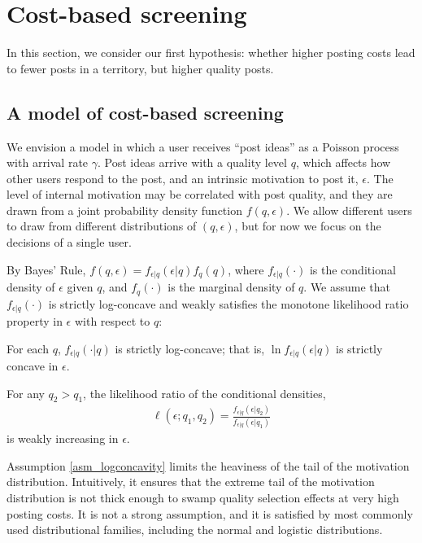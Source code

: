 \section{Cost-based screening}\label{sec_pay_to_post}

In this section, we consider our first hypothesis: whether higher posting costs lead to fewer posts in a territory, but higher quality posts. 

\subsection{A model of cost-based screening} \label{sec_pay_to_post_model}

We envision a model in which a user receives ``post ideas'' as a Poisson process with arrival rate $\gamma$. Post ideas arrive with a quality level $q$, which affects how other users respond to the post, and an intrinsic motivation to post it, $\epsilon$. The level of internal motivation may be correlated with post quality, and they are drawn from a joint probability density function $f(q, \epsilon)$. We allow different users to draw from different distributions of $(q,\epsilon)$, but for now we focus on the decisions of a single user.

By Bayes' Rule, $f(q, \epsilon) = f_{\epsilon|q} (\epsilon | q) f_q (q)$, where $f_{\epsilon|q}(\cdot)$ is the conditional density of $\epsilon$ given $q$, and $f_q(\cdot)$ is the marginal density of $q$. We assume that $f_{\epsilon|q}(\cdot)$ is strictly log-concave and weakly satisfies the monotone likelihood ratio property in $\epsilon$ with respect to $q$:

\begin{assumption}\label{asm_logconcavity}
For each $q$, $f_{\epsilon|q}(\cdot | q)$ is strictly log-concave; that is, $\ln f_{\epsilon|q} (\epsilon | q)$ is strictly concave in $\epsilon$.
\end{assumption}
\begin{assumption}\label{asm_mlrp}
For any $q_2 > q_1$, the likelihood ratio of the conditional densities,
\begin{align*}
\ell(\epsilon;q_1, q_2) = \frac{f_{\epsilon|q}(\epsilon|q_2)}{f_{\epsilon|q}(\epsilon|q_1)}
\end{align*}
is weakly increasing in $\epsilon$.
\end{assumption}

Assumption \ref{asm_logconcavity} limits the heaviness of the tail of the motivation distribution. Intuitively, it ensures that the extreme tail of the motivation distribution is not thick enough to swamp quality selection effects at very high posting costs. It is not a strong assumption, and it is satisfied by most commonly used distributional families, including the normal and logistic distributions.

